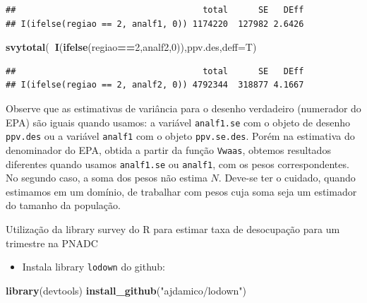 \documentclass[]{book}
\newenvironment{Shaded}{\begin{snugshade}}{\end{snugshade}}
\newcommand{\KeywordTok}[1]{\textcolor[rgb]{0.13,0.29,0.53}{\textbf{#1}}}
\newcommand{\DataTypeTok}[1]{\textcolor[rgb]{0.13,0.29,0.53}{#1}}
\newcommand{\DecValTok}[1]{\textcolor[rgb]{0.00,0.00,0.81}{#1}}
\newcommand{\StringTok}[1]{\textcolor[rgb]{0.31,0.60,0.02}{#1}}
\newcommand{\OperatorTok}[1]{\textcolor[rgb]{0.81,0.36,0.00}{\textbf{#1}}}
\newcommand{\NormalTok}[1]{#1}
\providecommand{\tightlist}{%
  \setlength{\itemsep}{0pt}\setlength{\parskip}{0pt}}
\theoremstyle{definition}
\theoremstyle{definition}
\theoremstyle{definition}
\theoremstyle{remark}
\let\BeginKnitrBlock\begin \let\EndKnitrBlock\end
\begin{document}
\begin{verbatim}
##                                     total      SE   DEff
## I(ifelse(regiao == 2, analf1, 0)) 1174220  127982 2.6426
\end{verbatim}

\begin{Shaded}
\begin{Highlighting}[]
\KeywordTok{svytotal}\NormalTok{(}\OperatorTok{~}\KeywordTok{I}\NormalTok{(}\KeywordTok{ifelse}\NormalTok{(regiao}\OperatorTok{==}\DecValTok{2}\NormalTok{,analf2,}\DecValTok{0}\NormalTok{)),ppv.des,}\DataTypeTok{deff=}\NormalTok{T)}
\end{Highlighting}
\end{Shaded}

\begin{verbatim}
##                                     total      SE   DEff
## I(ifelse(regiao == 2, analf2, 0)) 4792344  318877 4.1667
\end{verbatim}

Observe que as estimativas de variância para o desenho verdadeiro
(numerador do EPA) são iguais quando usamos: a variável
\texttt{analf1.se} com o objeto de desenho \texttt{ppv.des} ou a
variável \texttt{analf1} com o objeto \texttt{ppv.se.des}. Porém na
estimativa do denominador do EPA, obtida a partir da função
\texttt{Vwaas}, obtemos resultados diferentes quando usamos
\texttt{analf1.se} ou \texttt{analf1}, com os pesos correspondentes. No
segundo caso, a soma dos pesos não estima \(N\). Deve-se ter o cuidado,
quando estimamos em um domínio, de trabalhar com pesos cuja soma seja um
estimador do tamanho da população.

\BeginKnitrBlock{example}
\protect\hypertarget{exm:exe14}{}{\label{exm:exe14} }Utilização da library
survey do R para estimar taxa de desocupação para um trimestre na PNADC
\EndKnitrBlock{example}

\begin{itemize}
\tightlist
\item
  Instala library \texttt{lodown} \citep{R-lodown} do github:
\end{itemize}

\begin{Shaded}
\begin{Highlighting}[]
\KeywordTok{library}\NormalTok{(devtools)}
\KeywordTok{install_github}\NormalTok{(}\StringTok{"ajdamico/lodown"}\NormalTok{)}
\end{Highlighting}
\end{Shaded}
\end{document}
